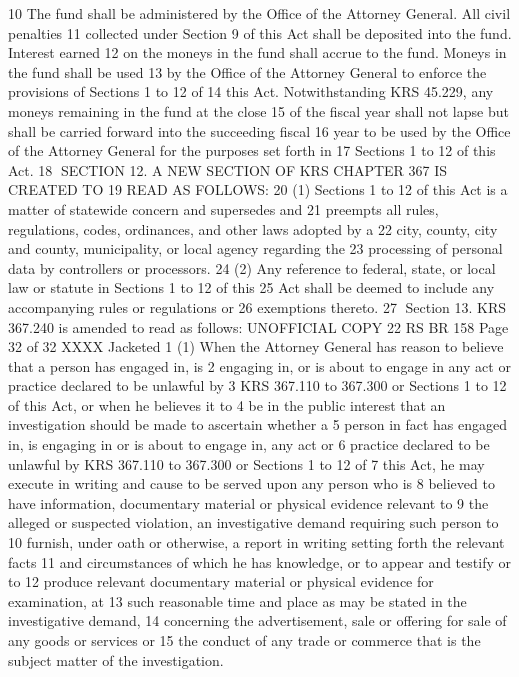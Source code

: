 10 The fund shall be administered by the Office of the Attorney General. All civil penalties
11 collected under Section 9 of this Act shall be deposited into the fund. Interest earned
12 on the moneys in the fund shall accrue to the fund. Moneys in the fund shall be used
13 by the Office of the Attorney General to enforce the provisions of Sections 1 to 12 of
14 this Act. Notwithstanding KRS 45.229, any moneys remaining in the fund at the close
15 of the fiscal year shall not lapse but shall be carried forward into the succeeding fiscal
16 year to be used by the Office of the Attorney General for the purposes set forth in
17 Sections 1 to 12 of this Act.
18 SECTION 12. A NEW SECTION OF KRS CHAPTER 367 IS CREATED TO
19 READ AS FOLLOWS:
20 (1) Sections 1 to 12 of this Act is a matter of statewide concern and supersedes and
21 preempts all rules, regulations, codes, ordinances, and other laws adopted by a
22 city, county, city and county, municipality, or local agency regarding the
23 processing of personal data by controllers or processors.
24 (2) Any reference to federal, state, or local law or statute in Sections 1 to 12 of this
25 Act shall be deemed to include any accompanying rules or regulations or
26 exemptions thereto.
27 Section 13. KRS 367.240 is amended to read as follows:
UNOFFICIAL COPY 22 RS BR 158
Page 32 of 32
XXXX Jacketed
1 (1) When the Attorney General has reason to believe that a person has engaged in, is
2 engaging in, or is about to engage in any act or practice declared to be unlawful by
3 KRS 367.110 to 367.300 or Sections 1 to 12 of this Act, or when he believes it to
4 be in the public interest that an investigation should be made to ascertain whether a
5 person in fact has engaged in, is engaging in or is about to engage in, any act or
6 practice declared to be unlawful by KRS 367.110 to 367.300 or Sections 1 to 12 of
7 this Act, he may execute in writing and cause to be served upon any person who is
8 believed to have information, documentary material or physical evidence relevant to
9 the alleged or suspected violation, an investigative demand requiring such person to
10 furnish, under oath or otherwise, a report in writing setting forth the relevant facts
11 and circumstances of which he has knowledge, or to appear and testify or to
12 produce relevant documentary material or physical evidence for examination, at
13 such reasonable time and place as may be stated in the investigative demand,
14 concerning the advertisement, sale or offering for sale of any goods or services or
15 the conduct of any trade or commerce that is the subject matter of the investigation.
